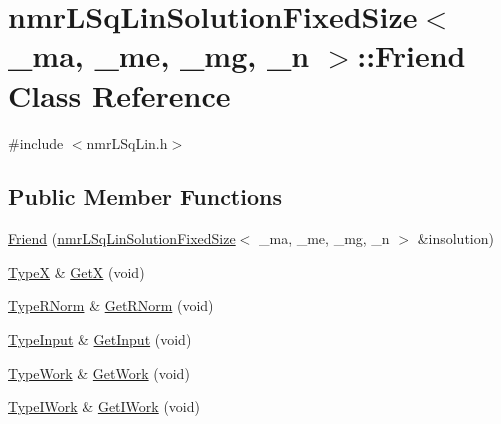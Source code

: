 \hypertarget{classnmr_l_sq_lin_solution_fixed_size_1_1_friend}{}\section{nmr\+L\+Sq\+Lin\+Solution\+Fixed\+Size$<$ \+\_\+ma, \+\_\+me, \+\_\+mg, \+\_\+n $>$\+:\+:Friend Class Reference}
\label{classnmr_l_sq_lin_solution_fixed_size_1_1_friend}


{\ttfamily \#include $<$nmr\+L\+Sq\+Lin.\+h$>$}

\subsection*{Public Member Functions}
\begin{DoxyCompactItemize}
\item 
\hyperlink{classnmr_l_sq_lin_solution_fixed_size_1_1_friend_a0082f67ae7c48fad71b8afacb71ddb52}{Friend} (\hyperlink{classnmr_l_sq_lin_solution_fixed_size}{nmr\+L\+Sq\+Lin\+Solution\+Fixed\+Size}$<$ \+\_\+ma, \+\_\+me, \+\_\+mg, \+\_\+n $>$ \&insolution)
\item 
\hyperlink{classnmr_l_sq_lin_solution_fixed_size_aa00d3b54073dac6aba6e3793d4f88348}{Type\+X} \& \hyperlink{classnmr_l_sq_lin_solution_fixed_size_1_1_friend_a1ea3dfb316ad254d671e608e62710f20}{Get\+X} (void)
\item 
\hyperlink{classnmr_l_sq_lin_solution_fixed_size_a384dc1235386018c6edbdc782c5f84be}{Type\+R\+Norm} \& \hyperlink{classnmr_l_sq_lin_solution_fixed_size_1_1_friend_aa2948ee8354630fdb64f7ec1611ee6d2}{Get\+R\+Norm} (void)
\item 
\hyperlink{classnmr_l_sq_lin_solution_fixed_size_adf9a982c0414dafb9fb1164b8da4f96f}{Type\+Input} \& \hyperlink{classnmr_l_sq_lin_solution_fixed_size_1_1_friend_a66a2b590c843bdfb703e05004a63adda}{Get\+Input} (void)
\item 
\hyperlink{classnmr_l_sq_lin_solution_fixed_size_a2804f3b3815a82a0f9655bcd2f86e7e4}{Type\+Work} \& \hyperlink{classnmr_l_sq_lin_solution_fixed_size_1_1_friend_aa42755764ab4cf09e6da2ce7d8b1159c}{Get\+Work} (void)
\item 
\hyperlink{classnmr_l_sq_lin_solution_fixed_size_a1838601b0a3e6fa7972e8854b888152a}{Type\+I\+Work} \& \hyperlink{classnmr_l_sq_lin_solution_fixed_size_1_1_friend_a69d7e55c3fd7922ebb4057ae2b0b19c9}{Get\+I\+Work} (void)
\end{DoxyCompactItemize}


